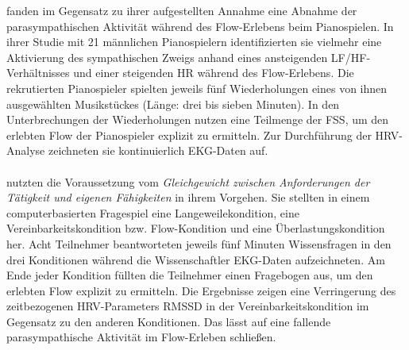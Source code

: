 \label{par:demanzano2010}

fanden im Gegensatz zu ihrer aufgestellten Annahme eine Abnahme der parasympathischen Aktivität während des Flow-Erlebens beim Pianospielen. In ihrer Studie mit 21 männlichen Pianospielern identifizierten sie vielmehr eine Aktivierung des sympathischen Zweigs anhand eines ansteigenden \acs{LF}/\acs{HF}-Verhältnisses und einer steigenden \ac{HR} während des Flow-Erlebens. Die rekrutierten Pianospieler spielten jeweils fünf Wiederholungen eines von ihnen ausgewählten Musikstückes (Länge: drei bis sieben Minuten). In den Unterbrechungen der Wiederholungen nutzen \citet{deManzano2010} eine Teilmenge der \ac{FSS}, um den erlebten Flow der Pianospieler explizit zu ermitteln. Zur Durchführung der \ac{HRV}-Analyse zeichneten sie kontinuierlich \ac{EKG}-Daten auf.

\paragraph{\citet{Keller2011}} 

\label{par:keller2011}

nutzten die Voraussetzung vom \emph{Gleichgewicht zwischen Anforderungen der Tätigkeit und eigenen Fähigkeiten} in ihrem Vorgehen. Sie stellten in einem computerbasierten Fragespiel eine Langeweilekondition, eine Vereinbarkeitskondition bzw. Flow-Kondition und eine Überlastungskondition her. Acht Teilnehmer beantworteten jeweils fünf Minuten Wissensfragen in den drei Konditionen während die Wissenschaftler \ac{EKG}-Daten aufzeichneten. Am Ende jeder Kondition füllten die Teilnehmer einen Fragebogen \citep{Keller2008} aus, um den erlebten Flow explizit zu ermitteln. Die Ergebnisse zeigen eine Verringerung des zeitbezogenen \ac{HRV}-Parameters \acs{RMSSD} in der Vereinbarkeitskondition im Gegensatz zu den anderen Konditionen. Das lässt auf eine fallende parasympathische Aktivität im Flow-Erleben schließen.

\paragraph{\citet{Gaggioli2013}} 

\label{par:gaggioli2013}


